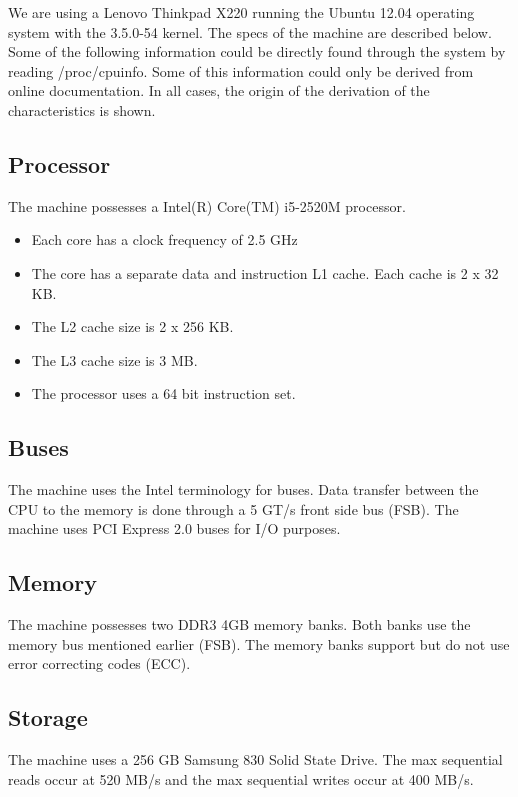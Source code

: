 We are using a Lenovo Thinkpad X220 running the Ubuntu 12.04 operating system with the 3.5.0-54 kernel. The specs of the machine are described below. Some of the following information could be directly found through the system by reading /proc/cpuinfo. Some of this information could only be derived from online documentation. In all cases, the origin of the derivation of the characteristics is shown.

\subsection{Processor}
The machine possesses a Intel(R) Core(TM) i5-2520M processor. 

\begin{itemize}
    \item{Each core has a clock frequency of 2.5 GHz}
    \item{The core has a separate data and instruction L1 cache. Each cache is 2 x 32 KB.}
\item{The L2 cache size is 2 x 256 KB.}
\item{The L3 cache size is 3 MB.}
\item{The processor uses a 64 bit instruction set.}
\end{itemize}

\subsection{Buses}

The machine uses the Intel terminology for buses. Data transfer between the CPU to the memory is done through a 5 GT/s front side bus (FSB). The machine uses PCI Express 2.0 buses for I/O purposes.

\subsection{Memory}

The machine possesses two DDR3 4GB memory banks. Both banks use the memory bus mentioned earlier (FSB). The memory banks support but do not use error correcting codes (ECC). 

\subsection{Storage}

The machine uses a 256 GB Samsung 830 Solid State Drive. The max sequential
reads occur at 520 MB/s and the max sequential writes occur at 400 MB/s.

